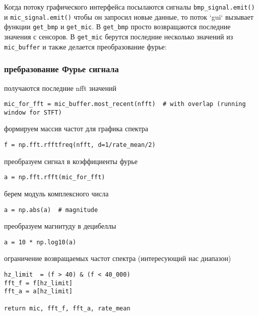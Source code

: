 \documentclass[../main.tex]{subfiles}
\begin{document}
Когда потоку графического интерфейса посылаются сигналы \texttt{bmp\_signal.emit()} и \texttt{mic\_signal.emit()} чтобы он запросил новые данные, то поток `gui` вызывает функции \texttt{get\_bmp} и \texttt{get\_mic}. В \texttt{get\_bmp} просто возвращаются последние значения с сенсоров. В \texttt{get\_mic} берутся последние несколько значений из \texttt{mic\_buffer} и также делается преобразование фурье:

\subsubsection{пребразование Фурье сигнала}

получаются последние nfft значений
\begin{lstlisting}
mic_for_fft = mic_buffer.most_recent(nfft)  # with overlap (running window for STFT)
\end{lstlisting}

формируем массив частот для графика спектра
\begin{lstlisting}
f = np.fft.rfftfreq(nfft, d=1/rate_mean/2)
\end{lstlisting}

преобразуем сигнал в коэффициенты фурье
\begin{lstlisting}
a = np.fft.rfft(mic_for_fft)
\end{lstlisting}

берем модуль комплексного числа
\begin{lstlisting}
a = np.abs(a)  # magnitude
\end{lstlisting}

преобразуем магнитуду в децибеллы
\begin{lstlisting}
a = 10 * np.log10(a)
\end{lstlisting}

ограничение возвращаемых частот спектра (интересующий нас диапазон)
\begin{lstlisting}
hz_limit  = (f > 40) & (f < 40_000)
fft_f = f[hz_limit]
fft_a = a[hz_limit]

return mic, fft_f, fft_a, rate_mean
\end{lstlisting}
\newpage
\end{document}
